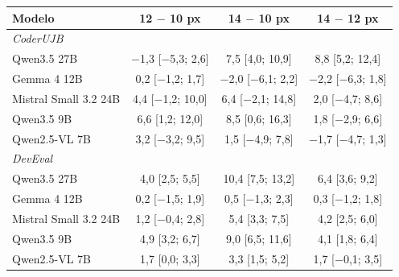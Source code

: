 \begin{tabular}{lccc}
\toprule
Modelo & 12 \ensuremath{-} 10 px & 14 \ensuremath{-} 10 px & 14 \ensuremath{-} 12 px \\
\midrule
\multicolumn{4}{l}{\emph{CoderUJB}} \\
Qwen3.5 27B & \ensuremath{-}1,3 [\ensuremath{-}5,3; 2,6] & 7,5 [4,0; 10,9] & 8,8 [5,2; 12,4] \\
Gemma 4 12B & 0,2 [\ensuremath{-}1,2; 1,7] & \ensuremath{-}2,0 [\ensuremath{-}6,1; 2,2] & \ensuremath{-}2,2 [\ensuremath{-}6,3; 1,8] \\
Mistral Small 3.2 24B & 4,4 [\ensuremath{-}1,2; 10,0] & 6,4 [\ensuremath{-}2,1; 14,8] & 2,0 [\ensuremath{-}4,7; 8,6] \\
Qwen3.5 9B & 6,6 [1,2; 12,0] & 8,5 [0,6; 16,3] & 1,8 [\ensuremath{-}2,9; 6,6] \\
Qwen2.5-VL 7B & 3,2 [\ensuremath{-}3,2; 9,5] & 1,5 [\ensuremath{-}4,9; 7,8] & \ensuremath{-}1,7 [\ensuremath{-}4,7; 1,3] \\
\midrule
\multicolumn{4}{l}{\emph{DevEval}} \\
Qwen3.5 27B & 4,0 [2,5; 5,5] & 10,4 [7,5; 13,2] & 6,4 [3,6; 9,2] \\
Gemma 4 12B & 0,2 [\ensuremath{-}1,5; 1,9] & 0,5 [\ensuremath{-}1,3; 2,3] & 0,3 [\ensuremath{-}1,2; 1,8] \\
Mistral Small 3.2 24B & 1,2 [\ensuremath{-}0,4; 2,8] & 5,4 [3,3; 7,5] & 4,2 [2,5; 6,0] \\
Qwen3.5 9B & 4,9 [3,2; 6,7] & 9,0 [6,5; 11,6] & 4,1 [1,8; 6,4] \\
Qwen2.5-VL 7B & 1,7 [0,0; 3,3] & 3,3 [1,5; 5,2] & 1,7 [\ensuremath{-}0,1; 3,5] \\
\bottomrule
\end{tabular}
